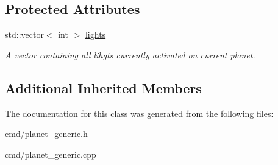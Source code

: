 \subsection*{Protected Attributes}
\begin{DoxyCompactItemize}
\item 
std\+::vector$<$ int $>$ \hyperlink{classPlanetaryOrbit_ac921fcde92cdf9ca3d490b6d99e67361}{lights}\hypertarget{classPlanetaryOrbit_ac921fcde92cdf9ca3d490b6d99e67361}{}\label{classPlanetaryOrbit_ac921fcde92cdf9ca3d490b6d99e67361}

\begin{DoxyCompactList}\small\item\em A vector containing all lihgts currently activated on current planet. \end{DoxyCompactList}\end{DoxyCompactItemize}
\subsection*{Additional Inherited Members}


The documentation for this class was generated from the following files\+:\begin{DoxyCompactItemize}
\item 
cmd/planet\+\_\+generic.\+h\item 
cmd/planet\+\_\+generic.\+cpp\end{DoxyCompactItemize}
